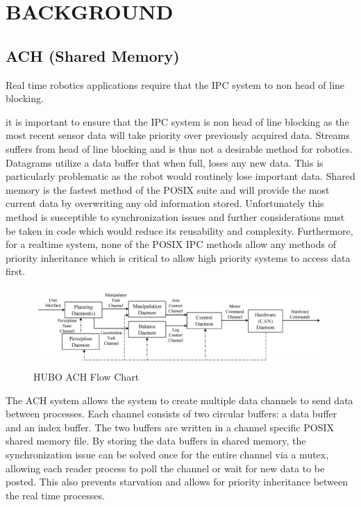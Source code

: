 \section{BACKGROUND}

\subsection{ACH (Shared Memory)}

Real time robotics applications require that the IPC system to non head of line blocking. 


 it is important to ensure that the IPC system is non head of line blocking as the most recent sensor data will take priority over previously acquired data. Streams suffers from head of line blocking and is thus not a desirable method for robotics. Datagrams utilize a data buffer that when full, loses any new data. This is particularly problematic as the robot would routinely lose important data. Shared memory is the fastest method of the POSIX suite and will provide the most current data by overwriting any old information stored. Unfortunately this method is susceptible to synchronization issues and further considerations must be taken in code which would reduce its reusability and complexity. Furthermore, for a realtime system, none of the POSIX IPC methods allow any methods of priority inheritance which is critical to allow high priority systems to access data first.

\begin{figure}[thpb]
 \centering
 \includegraphics[width=1.0\columnwidth]{./images/achflow.png}
  \caption{HUBO ACH Flow Chart}
  \label{fig:archr-sys-diagram}
\end{figure}

The ACH system allows the system to create multiple data channels to send data between processes. Each channel consists of two circular buffers: a data buffer and an index buffer. The two buffers are written in a channel specific POSIX shared memory file. By storing the data buffers in shared memory, the synchronization issue can be solved once for the entire channel via a mutex, allowing each reader process to poll the channel or wait for new data to be posted. This also prevents starvation and allows for priority inheritance between the real time processes.


